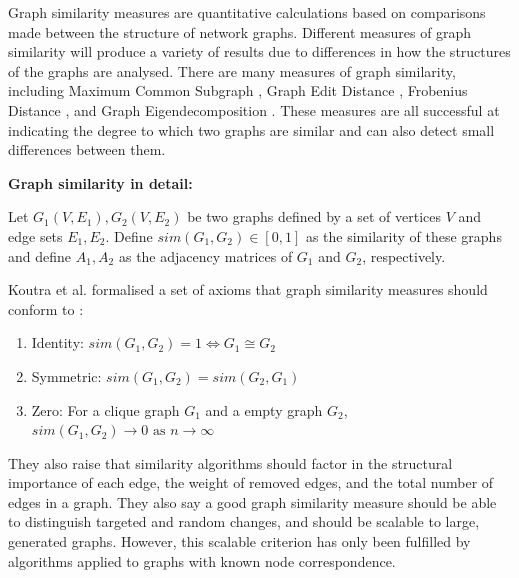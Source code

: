 Graph similarity measures are quantitative calculations based on comparisons made between the structure of network graphs. Different measures of graph similarity will produce a variety of results due to differences in how the structures of the graphs are analysed. There are many measures of graph similarity, including Maximum Common Subgraph \cite{MCS}, Graph Edit Distance \cite{GED}, Frobenius Distance \cite{frobenius-distance}, and Graph Eigendecomposition \cite{eigendecomposition}. These measures are all successful at indicating the degree to which two graphs are similar and can also detect small differences between them. 

\textbf{Graph similarity in detail:}

Let $G_{1}(V,E_{1} ), G_{2}(V,{E}_2)$ be two graphs defined by a set of vertices $V$ and edge sets $E_{1},E_{2}$. Define $sim(G_{1},G_{2} )\in[0,1]$ as the similarity of these graphs and define $A_{1},A_{2}$ as the adjacency matrices of $G_{1}$ and $G_{2}$, respectively. 

Koutra et al. formalised a set of axioms that graph similarity measures should conform to \cite{deltacon}:
\begin{enumerate}
    \item Identity: $sim(G_{1},G_{2})=1 \iff G_{1} \cong G_{2}$
    \item Symmetric:  $sim(G_{1},G_{2})=sim(G_{2},G_{1})$
    \item Zero: For a clique graph $G_{1}$ and a empty graph $G_{2}$, $sim(G_{1},G_{2}) \rightarrow 0 \text{ as } n\rightarrow \infty$ 
\end{enumerate}

They also raise that similarity algorithms should factor in the structural importance of each edge, the weight of removed edges, and the total number of edges in a graph. They also say a good graph similarity measure should be able to distinguish targeted and random changes, and should be scalable to large, generated graphs. However, this scalable criterion has only been fulfilled by algorithms applied to graphs with known node correspondence.

